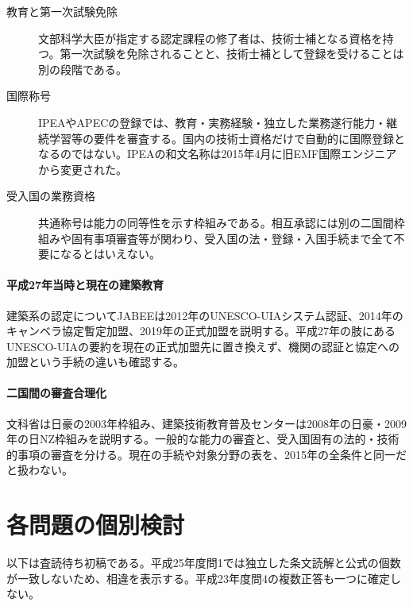 \begin{description}
 \item[教育と第一次試験免除] 文部科学大臣が指定する認定課程の修了者は、技術士補となる資格を持つ。第一次試験を免除されることと、技術士補として登録を受けることは別の段階である\parencite{engineer_act_current,ipej_associate_registration}。
 \item[国際称号] IPEAやAPECの登録では、教育・実務経験・独立した業務遂行能力・継続学習等の要件を審査する。国内の技術士資格だけで自動的に国際登録となるのではない。IPEAの和文名称は2015年4月に旧EMF国際エンジニアから変更された\parencite{ipej_ipea2014}。
 \item[受入国の業務資格] 共通称号は能力の同等性を示す枠組みである。相互承認には別の二国間枠組みや固有事項審査等が関わり、受入国の法・登録・入国手続まで全て不要になるとはいえない。
\end{description}

\paragraph{平成27年当時と現在の建築教育}
建築系の認定についてJABEEは2012年のUNESCO-UIAシステム認証、2014年のキャンベラ協定暫定加盟、2019年の正式加盟を説明する\parencite{jabee_canberra}。平成27年の肢にあるUNESCO-UIAの要約を現在の正式加盟先に置き換えず、機関の認証と協定への加盟という手続の違いも確認する。

\paragraph{二国間の審査合理化}
文科省は日豪の2003年枠組み、建築技術教育普及センターは2008年の日豪・2009年の日NZ枠組みを説明する\parencite{mext_international,jaeic_mutual2010}。一般的な能力の審査と、受入国固有の法的・技術的事項の審査を分ける。現在の手続や対象分野の表を、2015年の全条件と同一だと扱わない。

\section*{各問題の個別検討}
以下は査読待ち初稿である。平成25年度問1では独立した条文読解と公式の個数が一致しないため、相違を表示する。平成23年度問4の複数正答も一つに確定しない。


